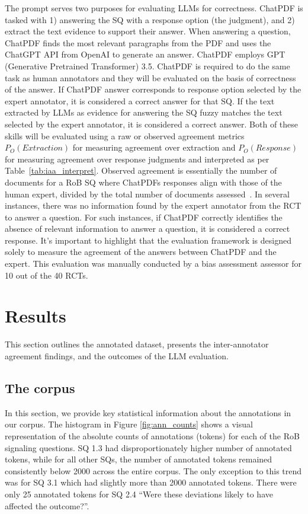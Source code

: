 \documentclass[sn-mathphys,Numbered]{sn-jnl}%
\theoremstyle{thmstyleone}%
\theoremstyle{thmstyletwo}%
\theoremstyle{thmstylethree}%
\begin{document}
The prompt serves two purposes for evaluating LLMs for correctness.
ChatPDF is tasked with 1) answering the SQ with a response option (the judgment), and 2) extract the text evidence to support their answer.
When answering a question, ChatPDF finds the most relevant paragraphs from the PDF and uses the ChatGPT API from OpenAI to generate an answer.
ChatPDF employs GPT (Generative Pretrained Transformer) 3.5.
ChatPDF is required to do the same task as human annotators and they will be evaluated on the basis of correctness of the answer.
If ChatPDF answer corresponds to response option selected by the expert annotator, it is considered a correct answer for that SQ. 
If the text extracted by LLMs as evidence for answering the SQ fuzzy matches the text selected by the expert annotator, it is considered a correct answer.
Both of these skills will be evaluated using a raw or observed agreement metrics $P_{O} (Extraction)$  for measuring agreement over extraction and $P_{O} (Response)$ for measuring agreement over response judgments and interpreted as per Table~\ref{tab:iaa_interpret}. 
Observed agreement is essentially the number of documents for a RoB SQ where ChatPDFs responses align with those of the human expert, divided by the total number of documents assessed~\cite{artstein2017inter}.
In several instances, there was no information found by the expert annotator from the RCT to answer a question. 
For such instances, if ChatPDF correctly identifies the absence of relevant information to answer a question, it is considered a correct response.
It's important to highlight that the evaluation framework is designed solely to measure the agreement of the answers between ChatPDF and the expert.
This evaluation was manually conducted by a bias assessment assessor for 10 out of the 40 RCTs.
%
%
%
\section{Results}
\label{sec:results}
%
This section outlines the annotated dataset, presents the inter-annotator agreement findings, and the outcomes of the LLM evaluation.
%
%
%
\subsection{The corpus}
\label{subsec:corpus}
%
In this section, we provide key statistical information about the annotations in our corpus.
The histogram in Figure \ref{fig:ann_counts} shows a visual representation of the absolute counts of annotations (tokens) for each of the RoB signaling questions.
SQ 1.3 had disproportionately higher number of annotated tokens, while for all other SQs, the number of annotated tokens remained consistently below 2000 across the entire corpus.
The only exception to this trend was for SQ 3.1 which had slightly more than 2000 annotated tokens.
There were only 25 annotated tokens for SQ 2.4 ``Were these deviations likely to have affected the outcome?''.
\end{document}
